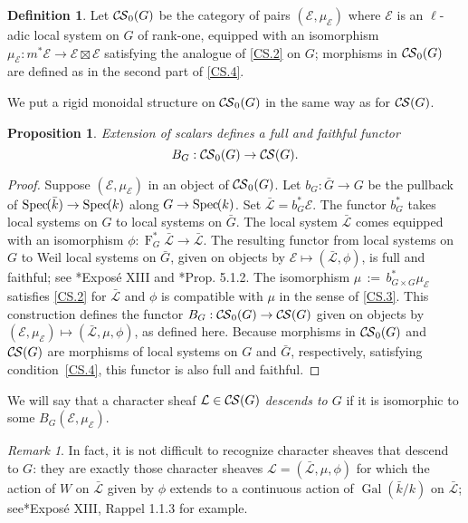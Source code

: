 \documentclass[10pt]{amsart}
\theoremstyle{plain}
\newtheorem{proposition}[theorem]{Proposition}
\theoremstyle{definition}
\newtheorem{definition}[theorem]{Definition}
\theoremstyle{remark}
\newtheorem{remark}[theorem]{Remark}
\newcommand{\bFq}{\bar{k}}
\newcommand{\Fq}{k}
\DeclareMathOperator{\Gal}{Gal}
\newcommand{\Frob}[1]{\operatorname{F}_{#1}}
\newcommand{\Spec}[1]{{\operatorname{Spec}\hskip-1pt( #1 )}}
\newcommand{\ceq}{{\, :=\, }}
\newcommand{\cs}[1]{{\mathcal{#1}}}
\newcommand{\gcs}[1]{{\mathcal{\bar #1}}}
\newcommand{\CS}{{\mathcal{C\hskip-0.8pt S}}}
\newcommand{\bCS}{{\CS_0}}
\newcommand{\bG}{\bar{G}}
\begin{document}
\begin{definition}
Let $\bCS(G)$ be the category of pairs $(\cs{E},\mu_\cs{E})$
where $\cs{E}$ is an $\ell$-adic local system on $G$ of rank-one,
equipped with an isomorphism $\mu_\cs{E} : m^* \cs{E} \to \cs{E} \boxtimes \cs{E}$
satisfying the analogue of \ref{CS.2} on $G$;
morphisms in $\bCS(G)$ are defined as in the second part of
\ref{CS.4}. 
\end{definition}

We put a rigid monoidal structure on $\bCS(G)$ in the same way as for $\CS(G)$.

\begin{proposition}\label{prop:BG}
Extension of scalars defines a full and faithful functor
\[
B_G : \bCS(G) \to \CS(G).
\]
\end{proposition}

\begin{proof}
 Suppose $(\cs{E},\mu_\cs{E})$ in an object of $\bCS(G)$.
 Let $b_G : {\bar G} \to G$ be the pullback of $\Spec{\bFq} \to \Spec{\Fq}$ along $G\to \Spec{\Fq}$.
 Set $\gcs{L} = b_G^* \cs{E}$. 
 The functor $b_G^*$ takes local systems on $G$ to local systems on $\bG$.
 The local system $\gcs{L}$ comes equipped with an isomorphism
 $\phi: \Frob{G}^* \gcs{L} \to \gcs{L}$.
 The resulting functor from local systems on $G$ to Weil local systems on $\bG$, given on objects by $\cs{E} \mapsto (\gcs{L},\phi)$, 
 is full and faithful; see \cite{deligne-katz:SGA7.2}*{Expos\'e XIII} and \cite{beilinson-bernstein-deligne:81a}*{Prop. 5.1.2}.
 The isomorphism $\mu \ceq b_{G\times G}^*\mu_\cs{E}$ satisfies \ref{CS.2}
 for $\gcs{L}$ and $\phi$ is compatible with $\mu$ in the sense of \ref{CS.3}.
 This construction defines the functor $B_G : \bCS(G) \to \CS(G)$ given on objects by $(\cs{E},\mu_\cs{E}) \mapsto (\gcs{L},\mu, \phi)$, as defined here. 
 Because morphisms in $\bCS(G)$ and $\CS(G)$ are morphisms of local systems on $G$ and $\bG$, respectively, satisfying condition~\ref{CS.4}, this functor is also full and faithful.
\end{proof}

We will say that a character sheaf $\cs{L} \in \CS(G)$ \emph{descends to $G$} if it is isomorphic to some $B_G(\cs{E}, \mu_\cs{E})$.

\begin{remark}\label{rem:descent}
In fact, it is not difficult to recognize character sheaves that descend to $G$: they are exactly those character sheaves $\cs{L} = (\gcs{L},\mu,\phi)$ for which the action of $W$ on $\gcs{L}$ given by $\phi$ extends to a continuous action of $\Gal(\bFq/\Fq)$ on $\gcs{L}$; see\cite{deligne-katz:SGA7.2}*{Expos\'e XIII, Rappel 1.1.3} for example. 
\end{remark}
\end{document}
